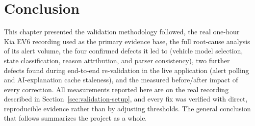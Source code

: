 \section{Conclusion}

This chapter presented the validation methodology followed, the real one-hour Kia EV6 recording used as the primary evidence base, the full root-cause analysis of its alert volume, the four confirmed defects it led to (vehicle model selection, state classification, reason attribution, and parser consistency), two further defects found during end-to-end re-validation in the live application (alert polling and AI-explanation cache staleness), and the measured before/after impact of every correction. All measurements reported here are on the real recording described in Section~\ref{sec:validation-setup}, and every fix was verified with direct, reproducible evidence rather than by adjusting thresholds. The general conclusion that follows summarizes the project as a whole.
